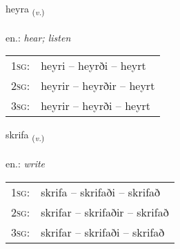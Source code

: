 \documentclass[frontgrid, backgrid]{flacards}\usepackage[]{graphicx}\usepackage[]{xcolor}
\begin{document}
\renewcommand{\flhead}{\vskip5pt \fboxsep=0pt {\small\bfseries\footnotesize Sagnorð | Verb}}
\renewcommand{\fcfoot}{\vskip5pt \fboxsep=0pt \hspace{2pt}{\small\bfseries\footnotesize 1K}}

\renewcommand{\blhead}{\vskip5pt {\small\bfseries\footnotesize Sagnorð | Verb }}
\renewcommand{\bcfoot}{\vskip5pt \hspace{2pt}{\small\bfseries\footnotesize 1K}}


{heyra \small{\textsubscript{(\textit{v.})}} \\[1ex] %
\textphonetic{[heiːra]} \\
en.: \emph{hear; listen} \\  [2ex]
\renewcommand*{\arraystretch}{0.8}
\begin{tabular}{p{1cm}l}
\textsc{1sg}: & heyri -- heyrði -- heyrt \\ 
\textsc{2sg}: & heyrir -- heyrðir -- heyrt \\ 
\textsc{3sg}: & heyrir -- heyrði -- heyrt \\ 
\end{tabular}
}

\renewcommand{\flhead}{\vskip5pt \fboxsep=0pt {\small\bfseries\footnotesize Sagnorð | Verb}}
\renewcommand{\fcfoot}{\vskip5pt \fboxsep=0pt \hspace{2pt}{\small\bfseries\footnotesize 1K}}

\renewcommand{\blhead}{\vskip5pt {\small\bfseries\footnotesize Sagnorð | Verb }}
\renewcommand{\bcfoot}{\vskip5pt \hspace{2pt}{\small\bfseries\footnotesize 1K}}


{skrifa \small{\textsubscript{(\textit{v.})}} \\[1ex] %
\textphonetic{[skrɪːva]} \\
en.: \emph{write} \\  [2ex]
\renewcommand*{\arraystretch}{0.8}
\begin{tabular}{p{1cm}l}
\textsc{1sg}: & skrifa -- skrifaði -- skrifað \\ 
\textsc{2sg}: & skrifar -- skrifaðir -- skrifað \\ 
\textsc{3sg}: & skrifar -- skrifaði -- skrifað \\ 
\end{tabular}
}
\end{document}
